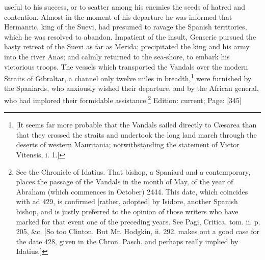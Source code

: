 useful to his success, or to scatter among his enemies the seeds of hatred and contention. Almost in the moment of his departure he was informed that Hermanric, king of the Suevi, had presumed to ravage the Spanish territories, which he was resolved to abandon. Impatient of the insult, Genseric pursued the hasty retreat of the Suevi as far as Merida; precipitated the king and his army into the river Anas; and calmly returned to the sea-shore, to embark his victorious troops. The vessels which transported the Vandals over the modern Straits of Gibraltar, a channel only twelve miles in breadth,\footnote{[It seems far more probable that the Vandals sailed directly to Cæsarea than that they crossed the straits and undertook the long land march through the deserts of western Mauritania; notwithstanding the statement of Victor Vitensis, i. 1.]} were furnished by the Spaniards, who anxiously wished their departure, and by the African general, who had implored their formidable assistance.\footnote{See the Chronicle of Idatius. That bishop, a Spaniard and a contemporary, places the passage of the Vandals in the month of May, of the year of Abraham (which commences in October) 2444. This date, which coincides with ad 429, is confirmed [rather, adopted] by Isidore, another Spanish bishop, and is justly preferred to the opinion of those writers who have marked for that event one of the preceding years. See Pagi, Critica, tom. ii. p. 205, \&c. [So too Clinton. But Mr. Hodgkin, ii. 292, makes out a good case for the date 428, given in the Chron. Pasch. and perhaps really implied by Idatius.]}
Edition: current; Page: [345]

